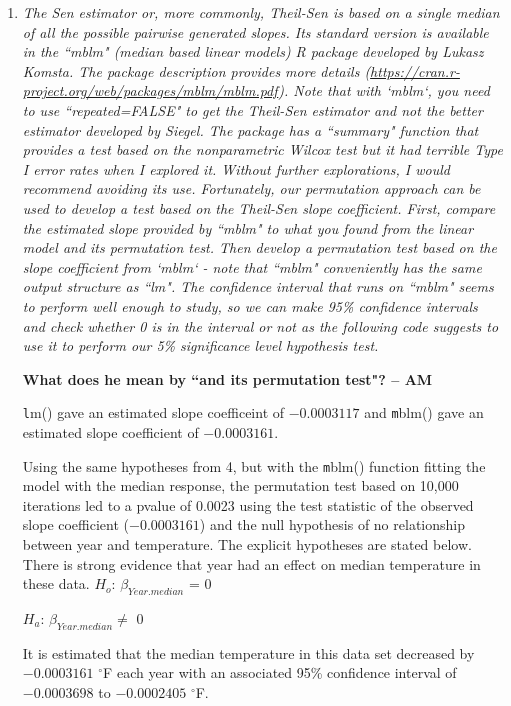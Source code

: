\documentclass[11pt]{article}
\begin{document}
\begin{enumerate}
\item%
{\it The Sen estimator or, more commonly, Theil-Sen is based on a single median of all the possible pairwise generated slopes. Its standard version is available in the ``mblm" (median based linear models) R package developed by Lukasz Komsta. The package description provides more details (\url{https://cran.r-project.org/web/packages/mblm/mblm.pdf}). Note that with `mblm`, you need to use ``repeated=FALSE" to get the Theil-Sen estimator and not the better estimator developed by Siegel. The package has a ``summary" function that provides a test based on the nonparametric Wilcox test but it had terrible Type I error rates when I explored it. Without further explorations, I would recommend avoiding its use. Fortunately, our permutation approach can be used to develop a test based on the Theil-Sen slope coefficient. First, compare the estimated slope provided by ``mblm" to what you found from the linear model and its permutation test. Then develop a permutation test based on the slope coefficient from `mblm` - note that ``mblm" conveniently has the same output structure as ``lm". The confidence interval that runs on ``mblm" seems to perform well enough to study, so we can make 95\% confidence intervals and check whether 0 is in the interval or not as the following code suggests to use it to perform our 5\% significance level hypothesis test.}

{\bf What does he mean by ``and its permutation test"? -- AM}




{\texttt lm()} gave an estimated slope coefficeint of \ensuremath{-0.0003117} and {\texttt mblm()} gave an estimated slope coefficient of \ensuremath{-0.0003161}.

Using the same hypotheses from 4, but with the {\texttt mblm()} function fitting the model with the median response, the permutation test based on 10,000 iterations led to a pvalue of 0.0023 using the test statistic of the observed slope coefficient (\ensuremath{-0.0003161}) and the null hypothesis of no relationship between year and temperature. The explicit hypotheses are stated below. There is strong evidence that year had an effect on median temperature in these data. 
$H_{o}$: $\beta_{Year.median}$ = 0

$H_{a}$: $\beta_{Year.median} \neq$ 0

It is estimated that the median temperature in this data set decreased by \ensuremath{-0.0003161} $^\circ$F each year with an associated 95\% confidence interval of \ensuremath{-0.0003698} to \ensuremath{-0.0002405} $^\circ$F.


\end{enumerate}
\end{document}
